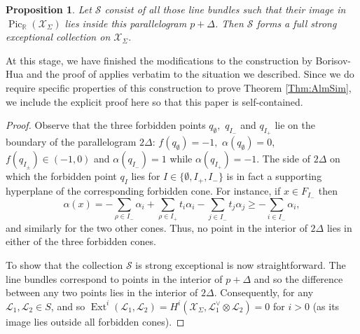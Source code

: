 \documentclass[reqno, 12pt]{amsart}
\newtheorem{proposition}[theorem]{Proposition}
\theoremstyle{definition}
\numberwithin{equation}{section}
\newcommand{\R}{\mathbb{R}}
\newcommand{\Ext}{\operatorname{Ext}}
\begin{document}
\begin{proposition}
    \label{Prop:ExcColln}
    Let $\mathcal{S}$ consist of all those line bundles such that their image in $\operatorname{Pic}_\R(\mathcal{X}_\Sigma)$ lies inside this parallelogram $p+\Delta$. Then $\mathcal{S}$ forms a full strong exceptional collection on $\mathcal{X}_\Sigma$.
\end{proposition}

At this stage, we have finished the modifications to the construction by Borisov-Hua \cite{BH09} and the proof of \cite[Theorem 5.11]{BH09} applies verbatim to the situation we described. Since we do require specific properties of this construction to prove Theorem \ref{Thm:AlmSim}, we include the explicit proof here so that this paper is self-contained.
\begin{proof}
     Observe that the three forbidden points $q_{\emptyset},$ $q_{I_-}$ and $q_{I_+}$ lie on the boundary of the parallelogram $2\Delta$: $f(q_{\emptyset})=-1,$ $\alpha(q_{\emptyset})=0$, $f(q_{I_\pm})\in (-1,0)$ and $\alpha(q_{I_-})=1$ while $\alpha(q_{I_+})=-1$. The side of $2\Delta$ on which the forbidden point $q_I$ lies for $I\in \{\emptyset, I_+, I_-\}$ is in fact a supporting hyperplane of the corresponding forbidden cone. For instance, if $x\in F_{I_-}$ then \[
\alpha(x)=-\sum_{\rho\in I_-}\alpha_i+\sum_{\rho\in I_+}t_i\alpha_i-\sum_{j\in I_-}t_j\alpha_j\ge -\sum_{i\in I_-}\alpha_i,
\]
and similarly for the two other cones. Thus, no point in the interior of $2\Delta$ lies in either of the three forbidden cones.


To show that the collection $\mathcal{S}$ is strong exceptional is now straightforward. The line bundles correspond to points in the interior of $p+\Delta$ and so the difference between any two points lies in the interior of $2\Delta$. Consequently, for any $\mathcal{L}_1, \mathcal{L}_2\in S$, and so $\Ext^i(\mathcal{L}_1,\mathcal{L}_2)=H^i(\mathcal{X}_\Sigma,\mathcal{L}_1^\vee\otimes \mathcal{L}_2)=0$ for $i>0$ (as its image lies outside all forbidden cones). 



\end{proof}
\end{document}
